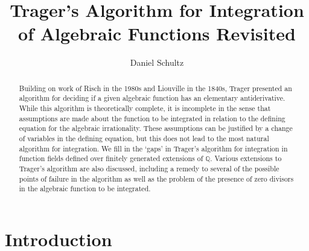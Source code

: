 \documentclass[12pt,reqno]{amsart}
\title{Trager's Algorithm for Integration of Algebraic Functions Revisited}
\author{Daniel Schultz}
\numberwithin{equation}{section}
\newcommand{\bbQ}[0]  { \mathbb{Q}}
\begin{document}
\begin{abstract}
 Building on work of Risch in the 1980s and Liouville in the 1840s, Trager presented an algorithm for deciding if a given algebraic function has an elementary antiderivative. While this algorithm is theoretically complete, it is incomplete in the sense that assumptions are made about the function to be integrated in relation to the defining equation for the algebraic irrationality. These assumptions can be justified by a change of variables in the defining equation, but this does not lead to the most natural algorithm for integration. We fill in the `gaps' in Trager's algorithm for integration in function fields defined over finitely generated extensions of $\bbQ$. Various extensions to Trager's algorithm are also discussed, including a remedy to several of the possible points of failure in the algorithm as well as the problem of the presence of zero divisors in the algebraic function to be integrated.
\end{abstract}


\maketitle


\section{Introduction}
\end{document}
